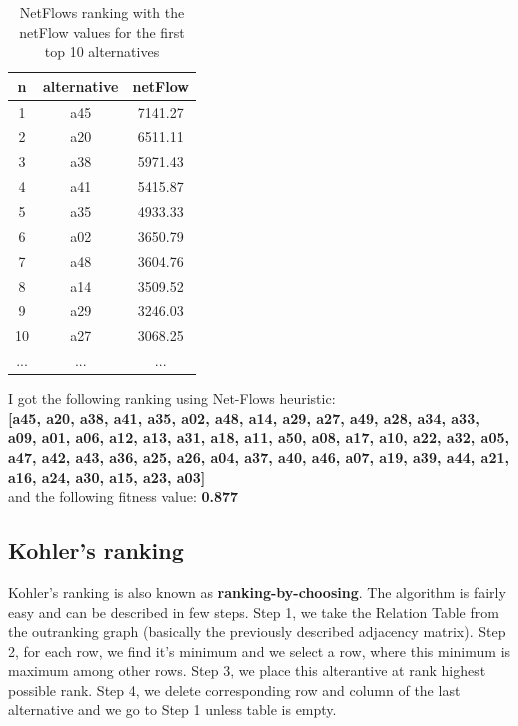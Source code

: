 \documentclass[a4paper]{article}
\begin{document}
\begin{table}[H]
	\centering
	\begin{tabular}{|c|c|c|}
		\hline
		n                   & alternative & netFlow \\ \hline
		1 & a45 & 7141.27 \\ \hline
		2 & a20 & 6511.11 \\ \hline
		3 & a38 & 5971.43 \\ \hline
		4 & a41 & 5415.87 \\ \hline
		5 & a35 & 4933.33 \\ \hline
		6 & a02 & 3650.79 \\ \hline
		7 & a48 & 3604.76 \\ \hline
		8 & a14 & 3509.52 \\ \hline
		9 & a29 & 3246.03 \\ \hline
		10 & a27 & 3068.25 \\ \hline
		... & ... & ... \\ \hline
	\end{tabular}
	\caption{NetFlows ranking with the netFlow values for the first top 10 alternatives}
	\label{fig:netflows2}
\end{table}

I got the following ranking using Net-Flows heuristic:\\

\textbf{[a45, a20, a38, a41, a35, a02, a48, a14, a29, a27, a49, a28, a34, a33, a09, a01, a06, a12, a13, a31, a18, a11, a50, a08, a17, a10, a22, a32, a05, a47, a42, a43, a36, a25, a26, a04, a37, a40, a46, a07, a19, a39, a44, a21, a16, a24, a30, a15, a23, a03]}\\

and the following fitness value: \textbf{0.877}

\subsection{Kohler's ranking}

Kohler's ranking is also known as \textbf{ranking-by-choosing}. The algorithm is fairly easy and can be described in few steps. Step 1, we take the Relation Table from the outranking graph (basically the previously described adjacency matrix). Step 2, for each row, we find it's minimum and we select a row, where this minimum is maximum among other rows. Step 3, we place this alterantive at rank highest possible rank. Step 4, we delete corresponding row and column of the last alternative and we go to Step 1 unless table is empty.
\end{document}
